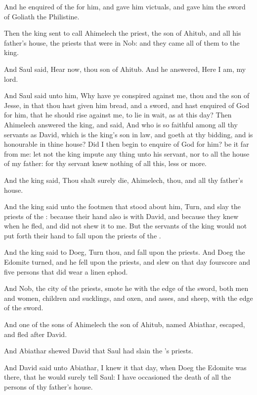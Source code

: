 \verse And he enquired of the \LORD for him, and gave him victuals, and gave him the sword of Goliath the Philistine.

\verse Then the king sent to call Ahimelech the priest, the son of Ahitub, and all his father's house, the priests that were in Nob: and they came all of them to the king.

\verse And Saul said, Hear now, thou son of Ahitub. And he answered, Here I am, my lord.

\verse And Saul said unto him, Why have ye conspired against me, thou and the son of Jesse, in that thou hast given him bread, and a sword, and hast enquired of God for him, that he should rise against me, to lie in wait, as at this day?  \verse Then Ahimelech answered the king, and said, And who is so faithful among all thy servants as David, which is the king's son in law, and goeth at thy bidding, and is honourable in thine house?  \verse Did I then begin to enquire of God for him? be it far from me: let not the king impute any thing unto his servant, nor to all the house of my father: for thy servant knew nothing of all this, less or more.

\verse And the king said, Thou shalt surely die, Ahimelech, thou, and all thy father's house.

\verse And the king said unto the footmen that stood about him, Turn, and slay the priests of the \LORD: because their hand also is with David, and because they knew when he fled, and did not shew it to me.  But the servants of the king would not put forth their hand to fall upon the priests of the \LORD.

\verse And the king said to Doeg, Turn thou, and fall upon the priests.  And Doeg the Edomite turned, and he fell upon the priests, and slew on that day fourscore and five persons that did wear a linen ephod.

\verse And Nob, the city of the priests, smote he with the edge of the sword, both men and women, children and sucklings, and oxen, and asses, and sheep, with the edge of the sword.

\verse And one of the sons of Ahimelech the son of Ahitub, named Abiathar, escaped, and fled after David.

\verse And Abiathar shewed David that Saul had slain the \LORD's priests.

\verse And David said unto Abiathar, I knew it that day, when Doeg the Edomite was there, that he would surely tell Saul: I have occasioned the death of all the persons of thy father's house.

